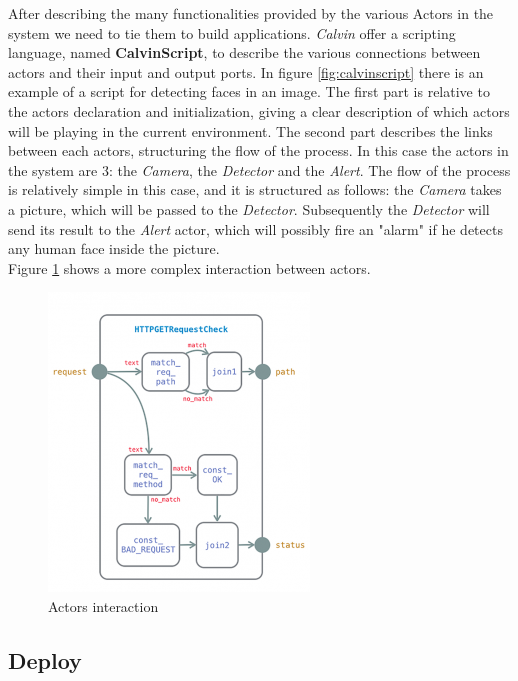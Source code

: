  After describing the many functionalities provided by the various Actors in the system
  we need to tie them to build applications. \textit{Calvin} offer a scripting language,
  named \textbf{CalvinScript}, to describe the various connections between actors
  and their input and output ports. In figure \ref{fig:calvinscript} there is an example
  of a script for detecting faces in an image. The first part is relative to the actors declaration
  and initialization, giving a clear description of which actors will be playing in the current
  environment. The second part describes the links between each actors, structuring the flow
  of the process. In this case the actors in the system are 3: the \textit{Camera}, the \textit{Detector}
  and the \textit{Alert}. The flow of the process is relatively simple in this case, and it is structured
  as follows: the  \textit{Camera} takes a picture, which will be passed to the \textit{Detector}. Subsequently
  the \textit{Detector} will send its result to the \textit{Alert} actor, which will possibly fire an "alarm" if he
  detects any human face inside the picture.\\
  Figure \ref{fig:calvinactors} shows a more complex interaction between actors. %

  \begin{figure}[h]
  \caption{Actors interaction}
  \label{fig:calvinactors}
  \centering
  \includegraphics[scale=0.75]{calvin3.png}
  \end{figure}



\subsection{Deploy}

